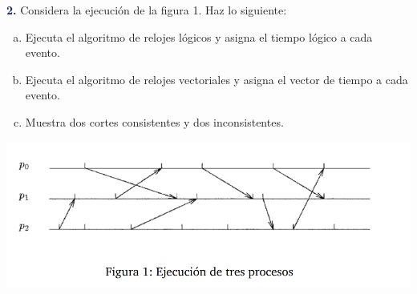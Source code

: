 \newpage
\textbf{\textcolor{MidnightBlue}{2.}}
Considera la ejecución de la figura 1. Haz lo siguiente:
\begin{enumerate}[a)]
\item Ejecuta el algoritmo de relojes lógicos y asigna el tiempo lógico a cada evento.
\item Ejecuta el algoritmo de relojes vectoriales y asigna el vector de tiempo
a cada evento.
\item Muestra dos cortes consistentes y dos inconsistentes.
\end{enumerate}
\begin{center}
    \includegraphics[scale=0.5]{Grapho.png}
\end{center}

